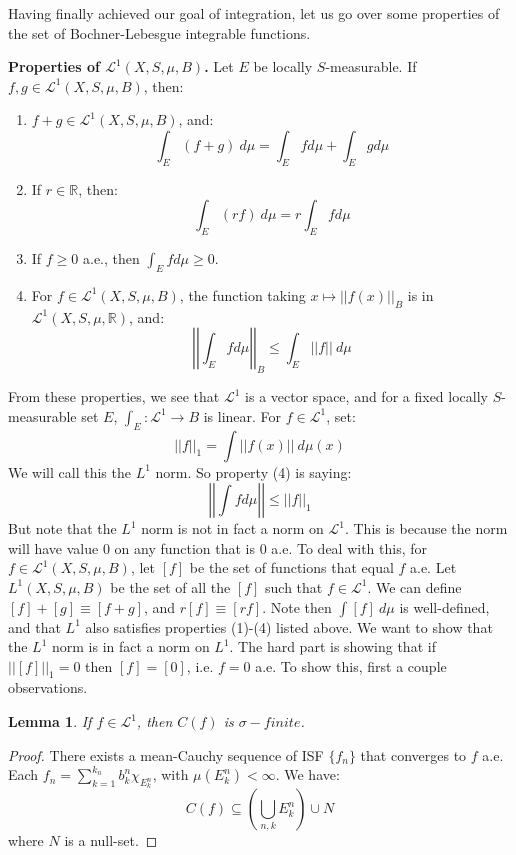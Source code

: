 \documentclass[a4paper,12pt]{report}
\newcommand{\ms}[1]{\mathscr{#1}}
\newcommand{\sse} {\subseteq}
\newtheorem{lemma}[theorem]{Lemma}
\begin{document}
	\noindent Having finally achieved our goal of integration, let us go over some properties of the set of Bochner-Lebesgue integrable functions.  
	
	\vspace{3mm}	
	
	\noindent \textbf{Properties of $\ms{L}^1(X, S, \mu, B)$.} \newline
	Let $E$ be locally $S$-measurable. If $f, g \in \ms{L}^1(X, S, \mu, B)$, then:
	\begin{enumerate}
	
		\item $f + g \in \ms{L}^1(X, S, \mu, B)$, and:
		\[ \int_E (f + g) ~ d\mu = \int_E f d\mu + \int_E g d\mu \]
		
		\item If $r \in \mathbb{R}$, then:
		\[ \int_E (rf) ~ d\mu = r \int_E f d\mu \]
		
		\item If $f \geq 0$ a.e., then $\int_E f d\mu \geq 0$. 
		
		\item For $f \in \ms{L}^1(X, S, \mu, B)$, the function taking $x \mapsto ||f(x)||_B$ is in $\ms{L}^1(X, S, \mu, \mathbb{R})$, and:
		\[ \left|\left|\int_E f d\mu \right|\right|_B \leq \int_E ||f|| ~ d\mu \]
	
	\end{enumerate}

	\noindent From these properties, we see that $\ms{L}^1$ is a vector space, and for a fixed locally $S$-measurable set $E$, $\int_E : \ms{L}^1 \rightarrow B$ is linear. For $f \in \ms{L}^1$, set:
	 \[ ||f||_1 = \int ||f(x)|| ~ d\mu(x) \]
	 We will call this the $L^1$ norm. So property (4) is saying:
	 \[ \left|\left| \int f d\mu \right| \right| \leq ||f||_1 \]
	 But note that the $L^1$ norm is not in fact a norm on $\ms{L}^1$. This is because the norm will have value 0 on any function that is 0 a.e. To deal with this, for $f \in \ms{L}^1(X, S, \mu, B)$, let $[f]$ be the set of functions that equal $f$ a.e. Let $L^1(X, S, \mu, B)$ be the set of all the $[f]$ such that $f \in \ms{L}^1$. We can define $[f] + [g] \equiv [f + g]$, and $r[f] \equiv [rf]$. Note then $\int [f] ~ d\mu$ is well-defined, and that $L^1$ also satisfies properties (1)-(4) listed above. We want to show that the $L^1$ norm is in fact a norm on $L^1$. The hard part is showing that if $||[f]||_1 = 0$ then $[f] = [0]$, i.e. $f = 0$ a.e. To show this, first a couple observations. 
	 
	 \begin{lemma}
	 If $f \in \ms{L}^1$, then $C(f)$ is $\sigma-finite$. 
	 \end{lemma}
	 \begin{proof}
	 There exists a mean-Cauchy sequence of ISF $\{f_n\}$ that converges to $f$ a.e. Each $f_n = \sum_{k=1}^{k_n} b_k^n \chi_{E_k^n}$, with $\mu(E_k^n) < \infty$. We have:
	 \[ C(f) \sse \left( \bigcup_{n, k} E_k^n \right) \cup N \]
	 where $N$ is a null-set. 
	 \end{proof}
	 
\end{document}
